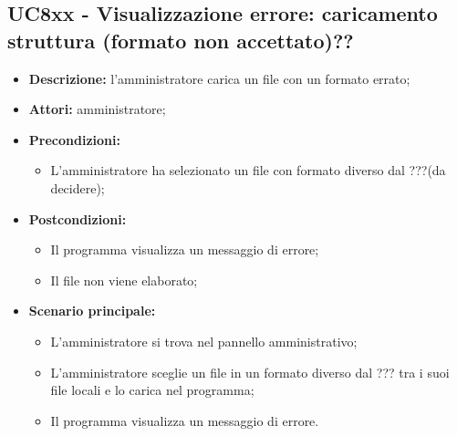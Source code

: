 \subsection{UC8xx - Visualizzazione errore: caricamento struttura (formato non accettato)??}
\label{sec:UC8xxx}
\begin{itemize}
	\item \textbf{Descrizione:} l’amministratore carica un file con un formato errato;
	\item \textbf{Attori:} amministratore;
	\item \textbf{Precondizioni:} 
	\begin{itemize}
		\item L’amministratore ha selezionato un file con formato diverso dal ???(da decidere);
	\end{itemize}
	\item \textbf{Postcondizioni:} 
	\begin{itemize}
		\item Il programma visualizza un messaggio di errore;
		\item Il file non viene elaborato;
	\end{itemize}
	\item \textbf{Scenario principale:} 
	\begin{itemize}
		\item L’amministratore si trova nel pannello amministrativo;
		\item L’amministratore sceglie un file in un formato diverso dal ??? tra i suoi file locali e lo carica nel programma;
		\item Il programma visualizza un messaggio di errore.
	\end{itemize}
\end{itemize}

